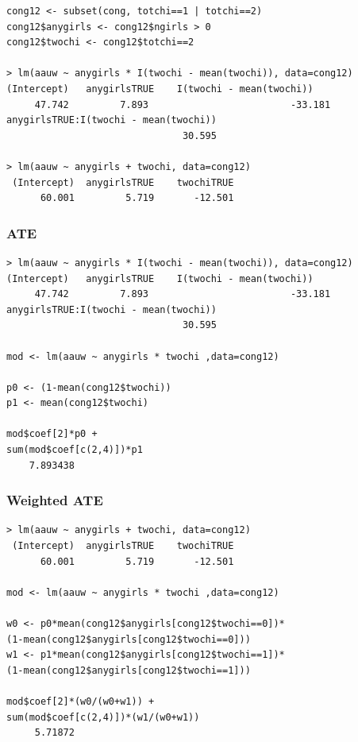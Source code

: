 \documentclass{beamer}
\begin{document}
\begin{frame}[fragile]

\begin{verbatim}
cong12 <- subset(cong, totchi==1 | totchi==2)
cong12$anygirls <- cong12$ngirls > 0
cong12$twochi <- cong12$totchi==2

> lm(aauw ~ anygirls * I(twochi - mean(twochi)), data=cong12)
(Intercept)   anygirlsTRUE    I(twochi - mean(twochi))  
     47.742         7.893                         -33.181  
anygirlsTRUE:I(twochi - mean(twochi))  
                               30.595  

> lm(aauw ~ anygirls + twochi, data=cong12)
 (Intercept)  anygirlsTRUE    twochiTRUE  
      60.001         5.719       -12.501  

\end{verbatim}
\end{frame}

\begin{frame}[fragile]
\frametitle{ATE}
\begin{verbatim}
> lm(aauw ~ anygirls * I(twochi - mean(twochi)), data=cong12)
(Intercept)   anygirlsTRUE    I(twochi - mean(twochi))  
     47.742         7.893                         -33.181  
anygirlsTRUE:I(twochi - mean(twochi))  
                               30.595
                               
mod <- lm(aauw ~ anygirls * twochi ,data=cong12)

p0 <- (1-mean(cong12$twochi))
p1 <- mean(cong12$twochi)

mod$coef[2]*p0 + 
sum(mod$coef[c(2,4)])*p1
    7.893438 
\end{verbatim}
\end{frame}

\begin{frame}[fragile]
\frametitle{Weighted ATE}
\begin{verbatim}
> lm(aauw ~ anygirls + twochi, data=cong12)
 (Intercept)  anygirlsTRUE    twochiTRUE  
      60.001         5.719       -12.501  

mod <- lm(aauw ~ anygirls * twochi ,data=cong12)
    
w0 <- p0*mean(cong12$anygirls[cong12$twochi==0])*
(1-mean(cong12$anygirls[cong12$twochi==0]))
w1 <- p1*mean(cong12$anygirls[cong12$twochi==1])*
(1-mean(cong12$anygirls[cong12$twochi==1]))

mod$coef[2]*(w0/(w0+w1)) + 
sum(mod$coef[c(2,4)])*(w1/(w0+w1))
     5.71872 
\end{verbatim}
\end{frame}
\end{document}
